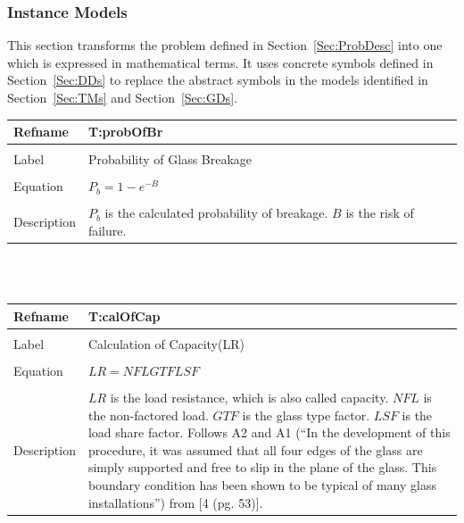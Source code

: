 \documentclass[12pt]{article}
\begin{document}
\subsubsection{Instance Models}
\label{Sec:IMs}
This section transforms the problem defined in Section~\ref{Sec:ProbDesc} into one which is expressed in mathematical terms. It uses concrete symbols defined in Section~\ref{Sec:DDs} to replace the abstract symbols in the models identified in Section~\ref{Sec:TMs} and Section~\ref{Sec:GDs}.
~\newline
\noindent \begin{minipage}{\textwidth}
\begin{tabular}{p{} p{}}
\toprule \textbf{Refname} & \textbf{T:probOfBr}
\label{T:probOfBr}
\\ \midrule \\
Label & Probability of Glass Breakage
\\ \midrule \\
Equation & ${P_{b}}=1-e^{-B}$
\\ \midrule \\
Description & ${P_{b}}$ is the calculated probability of breakage. $B$ is the risk of failure.
\\ \bottomrule \end{tabular}
\end{minipage}\\
~\newline
\noindent \begin{minipage}{\textwidth}
\begin{tabular}{p{} p{}}
\toprule \textbf{Refname} & \textbf{T:calOfCap}
\label{T:calOfCap}
\\ \midrule \\
Label & Calculation of Capacity(LR)
\\ \midrule \\
Equation & $LR=NFL GTF LSF$
\\ \midrule \\
Description & $LR$ is the load resistance, which is also called capacity. $NFL$ is the non-factored load. $GTF$ is the glass type factor. $LSF$ is the load share factor. Follows A2 and A1 (``In the development of this procedure, it was assumed that all four edges of the glass are simply supported and free to slip in the plane of the glass. This boundary condition has been shown to be typical of many glass installations'') from [4 (pg. 53)].
\\ \bottomrule \end{tabular}
\end{minipage}\\
\end{document}

